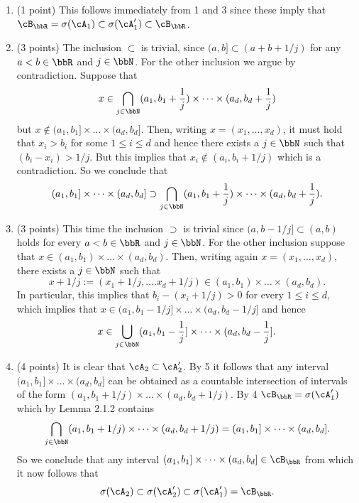 \begin{enumerate}[label=(\alph*)]
From 2 it follows that $O$ is a union over a subset collection of interval $(a_1,b_1) \times \dots \times (a_d, b_d)$ where $a_i,b_i \in \bbQ$. Since $\bbQ$ is countable and $d$ finite, the collection $\{(a_1,b_1) \times \dots \times (a_d, b_d) \, : \, a_i < b_i \in \bbQ\}$ is also countable and hence $O = \bigcup_{I \in \cA, I \subset O} I \in \sigma(\cA)$, from which it follows that $\cB_\bbR \subset \sigma(\cA)$.
\item (1 point) This follows immediately from 1 and 3 since these imply that $\cB_\bbR = \sigma(\cA_1) \subset \sigma(\cA_1^\prime) \subset \cB_\bbR$.
\item (3 points) The inclusion $\subset$ is trivial, since $(a,b] \subset (a + b +1/j)$ for any $a < b \in \bbR$ and $j \in \bbN$. For the other inclusion we argue by contradiction. Suppose that 
\[
	x \in \bigcap_{j \in \bbN} (a_1, b_1+\frac{1}{j}) \times \dots \times (a_d, b_d+\frac{1}{j})
\] 
but $x \notin (a_1,b_1] \times \dots \times (a_d, b_d]$. Then, writing $x = (x_1, \dots, x_d)$, it must hold that $x_i > b_i$ for some $1 \le i \le d$ and hence there exists a $j \in \bbN$ such that $(b_i-x_i) > 1/j$. But this implies that $x_i \notin (a_i,b_i+1/j)$ which is a contradiction. So we conclude that 
\[
	(a_1,b_1] \times \dots \times (a_d, b_d] \supset \bigcap_{j \in \bbN} (a_1, b_1+\frac{1}{j}) \times \dots \times (a_d, b_d+\frac{1}{j}).
\]
\item (3 points) This time the inclusion $\supset$ is trivial since $(a,b-1/j] \subset (a,b)$ holds for every $a < b \in \bbR$ and $j \in \bbN$. For the other inclusion suppose that $x \in (a_1,b_1) \times \dots \times (a_d, b_d)$. Then, writing again $x = (x_1, \dots, x_d)$, there exists a $j \in \bbN$ such that 
\[
	x + 1/j := (x_1 + 1/j, \dots. x_d + 1/j) \in (a_1,b_1) \times \dots \times (a_d, b_d).
\] 
In particular, this implies that $b_i - (x_i+1/j) > 0$ for every $1 \le i \le d$, which implies that $x \in (a_1,b_1 - 1/j] \times \dots \times (a_d, b_d-1/j]$ and hence 
\[
	x \in \bigcup_{j \in \bbN} (a_1, b_1-\frac{1}{j}] \times \dots \times (a_d, b_d-\frac{1}{j}].
\]
\item (4 points) It is clear that $\cA_2 \subset \cA_2^\prime$. By 5 it follows that any interval $(a_1,b_1] \times \dots \times (a_d, b_d]$ can be obtained as a countable intersection of intervals of the form $(a_1,b_1+1/j) \times \dots \times (a_d, b_d+1/j)$. By 4 $\cB_\bbR = \sigma(\cA_1^\prime)$ which by Lemma 2.1.2 contains 
\[
	\bigcap_{j \in \bbN} (a_1,b_1+1/j) \times \dots \times (a_d, b_d+1/j) = (a_1,b_1] \times \dots \times (a_d, b_d]. 
\]
So we conclude that any interval $(a_1,b_1] \times \dots \times (a_d, b_d] \in \cB_\bbR$ from which it now follows that
\[
	\sigma(\cA_2) \subset \sigma(\cA_2^\prime) \subset \sigma(\cA_1^\prime) = \cB_\bbR.
\]


\end{enumerate}

